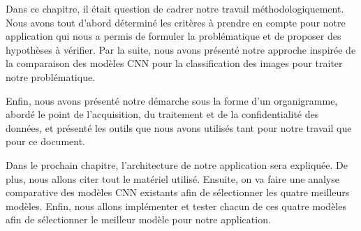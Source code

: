 Dans ce chapitre, il était question de cadrer notre travail méthodologiquement. Nous avons tout d’abord déterminé les critères à prendre en compte pour notre application qui nous a permis de formuler la problématique et de proposer des hypothèses à vérifier. Par la suite, nous avons présenté notre approche inspirée de la comparaison des modèles CNN pour la classification des images %
pour traiter notre problématique. 

Enfin, nous avons présenté notre démarche sous la forme d'un organigramme, abordé le point de l'acquisition, du traitement et de la confidentialité des données, et présenté les outils que nous avons utilisés tant pour notre travail que pour ce document.

Dans le prochain chapitre, l'architecture de notre application sera expliquée. De plus, nous allons citer tout le matériel utilisé. Ensuite, on va faire une analyse comparative des modèles CNN existants afin de sélectionner les quatre meilleurs modèles. Enfin, nous allons implémenter et tester chacun de ces quatre modèles afin de sélectionner le meilleur modèle pour notre application. 